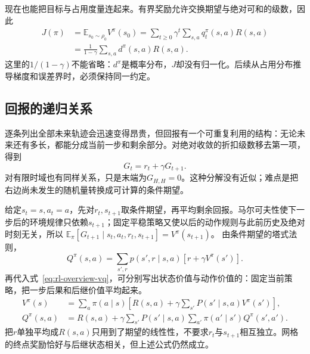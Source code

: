 现在也能把目标与占用度量连起来。有界奖励允许交换期望与绝对可和的级数，因此
\begin{equation}
\begin{aligned}
  J(\pi)
   &=\mathbb E_{s_0\sim\rho_0}V^\pi(s_0)
     =\sum_{t\geq0}\gamma^t\sum_{s,a}q_t^\pi(s,a)R(s,a)\\
   &=\frac{1}{1-\gamma}\sum_{s,a}d^\pi(s,a)R(s,a).
\end{aligned}
\label{eq:rl-overview-objective-occupancy}
\end{equation}
这里的$1/(1-\gamma)$不能省略：$d^\pi$是概率分布，$J$却没有归一化。后续从占用分布推导梯度和误差界时，必须保持同一约定。

\subsection{回报的递归关系}
\label{sec:rl-overview-bellman}

逐条列出全部未来轨迹会迅速变得昂贵，但回报有一个可重复利用的结构：无论未来还有多长，都能分成当前一步和剩余部分。对绝对收敛的折扣级数移去第一项，得到
\begin{equation}
  G_t=r_t+\gamma G_{t+1}.
  \label{eq:rl-overview-return-recursion}
\end{equation}
对有限时域也有同样关系，只是末端为$G_{H,H}=0$。这种分解没有近似；难点是把右边尚未发生的随机量转换成可计算的条件期望。

给定$s_t=s,a_t=a$，先对$r_t,s_{t+1}$取条件期望，再平均剩余回报。马尔可夫性使下一步后的环境规律只依赖$s_{t+1}$；固定平稳策略又使以后的动作规则与此前历史及绝对时刻无关，所以
$\mathbb E_\pi[G_{t+1}\mid s_t,a_t,r_t,s_{t+1}]=V^\pi(s_{t+1})$。
由条件期望的塔式法则，
\begin{equation}
  Q^\pi(s,a)=\sum_{s',r}p(s',r\mid s,a)
                         [r+\gamma V^\pi(s')].
  \label{eq:rl-overview-bellman-qv}
\end{equation}
再代入式~\eqref{eq:rl-overview-vq}，可分别写出状态价值与动作价值的：固定当前策略，把一步后果和后继价值平均起来。
\begin{align}
 V^\pi(s)
  &=\sum_a\pi(a\mid s)
        \left[R(s,a)+\gamma\sum_{s'}P(s'\mid s,a)V^\pi(s')\right],
        \label{eq:rl-overview-bellman-v}\\
 Q^\pi(s,a)
  &=R(s,a)+\gamma\sum_{s'}P(s'\mid s,a)
          \sum_{a'}\pi(a'\mid s')Q^\pi(s',a').
        \label{eq:rl-overview-bellman-q}
\end{align}
把$r$单独平均成$R(s,a)$只用到了期望的线性性，不要求$r_t$与$s_{t+1}$相互独立。网格的终点奖励恰好与后继状态相关，但上述公式仍然成立。

